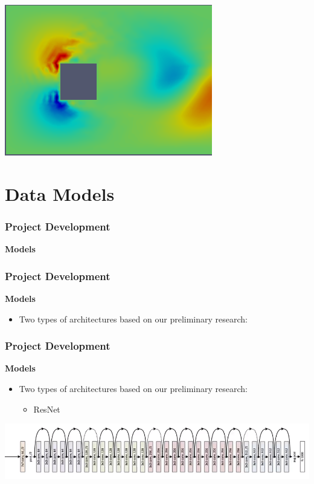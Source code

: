 \documentclass[18pt]{beamer}
\begin{document}
\begin{frame}[t]
\begin{center}
    \includegraphics[scale=0.27]{images/y-direction-rgb} \\
  \end{center}  
\end{frame}

\section{Data Models}
\begin{frame}[t]
  \frametitle{Project Development}
  \large{\textbf{Models}}
\end{frame}

\begin{frame}[t]
  \frametitle{Project Development}
  \large{\textbf{Models}}
  \begin{itemize}
  \item Two types of architectures based on our preliminary research:
  \end{itemize}
\end{frame}

\begin{frame}[t]
  \frametitle{Project Development}
  \large{\textbf{Models}}
  \begin{itemize}
  \item Two types of architectures based on our preliminary research:
    \begin{itemize}
    \item ResNet 
    \end{itemize}
  \end{itemize}
  \vspace{1cm}
  \begin{center}
      \includegraphics[scale=0.37]{images/nets/res}
    \end{center}
\end{frame}
\end{document}
